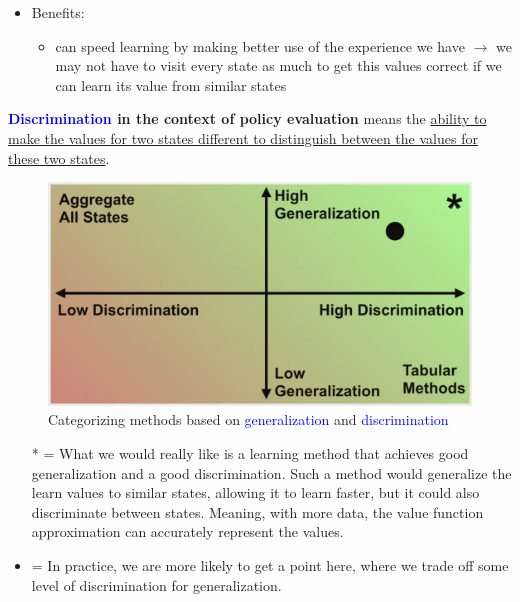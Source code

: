 \documentclass[12pt, a4paper]{article}
\begin{document}
\begin{itemize}
  \item Benefits:
  \begin{itemize}
    \item can speed learning by making better use of the experience we have $\rightarrow$ we may not have to visit every state as much to get this values correct if we can learn its value from similar states
  \end{itemize}
\end{itemize}


\textbf{\textcolor{blue}{Discrimination} in the context of policy evaluation} means the \uline{ability to make the values for two states different to distinguish between the values for these two states}.



\begin{figure}[H]
  \centering
    \includegraphics[width=0.8\columnwidth]{images/generalization-discrimination.png}
    \caption{Categorizing methods based on \textcolor{blue}{generalization} and \textcolor{blue}{discrimination}}
    \label{fig:generalization-discrimination}
\end{figure}
\begin{itemize}
  \item[*] = What we would really like is a learning method that achieves good generalization and a good discrimination. Such a method would generalize the learn values to similar states, allowing it to learn faster, but it could also discriminate between states. Meaning, with more data, the value function approximation can accurately represent the values.
  \item = In practice, we are more likely to get a point here, where we trade off some level of discrimination for generalization.
\end{itemize}
\end{document}
